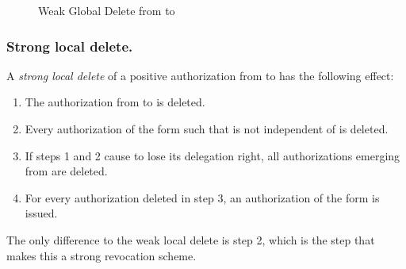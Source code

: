 \documentclass[runningheads]{llncs}
\begin{document}
\vspace{-3mm}
\begin{figure}[H]
\center
{}
\caption{Weak Global Delete from  to }
\end{figure}
\vspace{-7mm}

\subsubsection{Strong local delete.}
A \emph{strong local delete} of a positive authorization from  to  has the following effect:
\vspace{-1mm}
\begin{enumerate}
 \item The authorization from  to  is deleted.
 \item Every authorization of the form  such that  is not independent of  is deleted.
 \item If steps 1 and 2 cause  to lose its delegation right, all authorizations emerging from  are deleted.
 \item For every authorization  deleted in step 3, an authorization of the form  is issued.
\end{enumerate}
\vspace{-1mm}
The only difference to the weak local delete is step 2, which is the step that makes this a strong revocation scheme.
\end{document}

